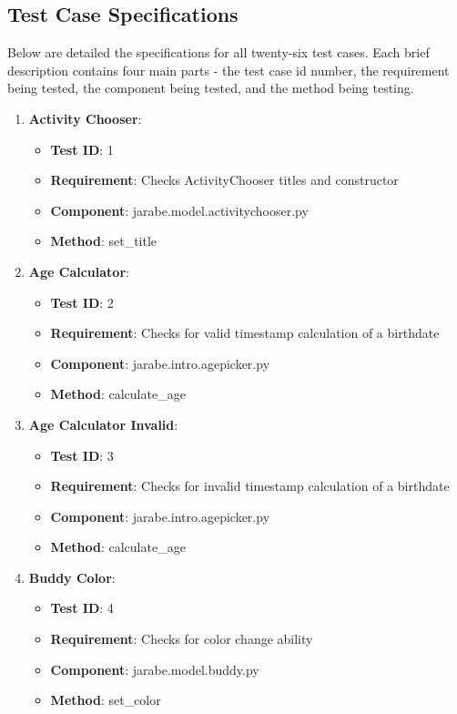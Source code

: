 \documentclass{article}
\begin{document}
\subsection{Test Case Specifications}
Below are detailed the specifications for all twenty-six test cases. Each brief description contains four main parts - the test case id number, the requirement being tested, the component being tested, and the method being testing.
\begin{enumerate}[noitemsep,topsep=0pt]
\item \textbf{Activity Chooser}:
\begin{itemize}[noitemsep,topsep=0pt]
\item \textbf{Test ID}: 1
\item \textbf{Requirement}: Checks ActivityChooser titles and constructor
\item \textbf{Component}: jarabe.model.activitychooser.py
\item \textbf{Method}: set\_title
\end{itemize}
\item \textbf{Age Calculator}:
\begin{itemize}[noitemsep,topsep=0pt]
\item \textbf{Test ID}: 2
\item \textbf{Requirement}: Checks for valid timestamp calculation of a birthdate
\item \textbf{Component}: jarabe.intro.agepicker.py
\item \textbf{Method}: calculate\_age
\end{itemize}
\item \textbf{Age Calculator Invalid}:
\begin{itemize}[noitemsep,topsep=0pt]
\item \textbf{Test ID}: 3
\item \textbf{Requirement}: Checks for invalid timestamp calculation of a birthdate
\item \textbf{Component}: jarabe.intro.agepicker.py
\item \textbf{Method}: calculate\_age
\end{itemize}
\item \textbf{Buddy Color}:
\begin{itemize}[noitemsep,topsep=0pt]
\item \textbf{Test ID}: 4
\item \textbf{Requirement}: Checks for color change ability
\item \textbf{Component}: jarabe.model.buddy.py
\item \textbf{Method}: set\_color

\end{itemize}
\end{enumerate}
\end{document}
